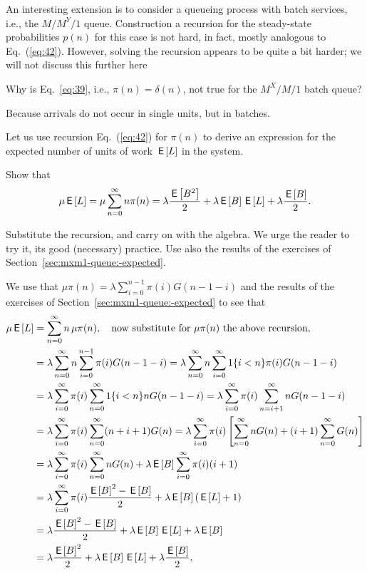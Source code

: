 An interesting extension is to consider a queueing process with batch
services, i.e., the $M/M^Y/1$ queue. Construction a recursion for the
steady-state probabilities $p(n)$ for this case is not hard, in fact,
mostly analogous to Eq.~(\ref{eq:42}).  However, solving the recursion
appears to be quite a bit harder; we will not discuss this further here

\begin{exercise}
  Why is Eq.~\eqref{eq:39}, i.e., $\pi(n)=\delta(n)$, not true for the
  $M^X/M/1$ batch queue?
\begin{solution}
 Because arrivals do not occur in single units, but in batches.
\end{solution}
\end{exercise}

Let us use  recursion Eq.~(\ref{eq:42}) for $\pi(n)$ to
 derive an expression for the expected number of units of work $\,\mathsf{E}\left[L\right]$
 in the system.
\begin{exercise}
 Show that
\begin{equation}\label{eq:67}
  \mu \,\mathsf{E}\left[L\right] =\mu \sum_{n=0}^\infty n \pi(n) = \lambda \frac{\,\mathsf{E}\left[B^2\right]}2  + \lambda \,\mathsf{E}\left[B\right] \,\mathsf{E}\left[L\right] +\lambda \frac{\,\mathsf{E}\left[B\right]}2.
\end{equation}
\begin{hint}
Substitute the
  recursion, and carry on with the algebra. We urge the reader to try
  it, its good (necessary) practice.  Use also the results of the
  exercises of Section~\ref{sec:mxm1-queue:-expected}.  
\end{hint}
\begin{solution}
  We use that $\mu \pi(n) =\lambda \sum_{i=0}^{n-1} \pi(i) G(n-1-i)$
  and the results of the exercises of
  Section~\ref{sec:mxm1-queue:-expected} to see that
\begin{align*}
  \mu \,\mathsf{E}\left[L\right]
  &=\sum_{n=0}^\infty n\, \mu \pi(n), \quad \text{now substitute for $\mu \pi(n)$ the above recursion}, \\
& =\lambda \sum_{n=0}^\infty n \sum_{i=0}^{n-1} \pi(i) G(n-1-i) 
  =\lambda \sum_{n=0}^\infty n \sum_{i=0}^\infty 1\{i<n\} \pi(i) G(n-1-i) \\
& =\lambda \sum_{i=0}^\infty \pi(i) \sum_{n=0}^\infty 1\{i<n\} n G(n-1-i) 
  =\lambda \sum_{i=0}^\infty \pi(i) \sum_{n=i+1}^\infty n G(n-1-i) \\
& =\lambda \sum_{i=0}^\infty \pi(i) \sum_{n=0}^\infty (n+i+1) G(n) 
  =\lambda \sum_{i=0}^\infty \pi(i) \left[\sum_{n=0}^\infty n G(n) +(i+1) \sum_{n=0}^\infty G(n)\right]  \\
  &=\lambda \sum_{i=0}^\infty \pi(i)\sum_{n=0}^\infty n G(n) +\lambda  \,\mathsf{E}\left[B\right] \sum_{i=0}^\infty \pi(i) (i+1)  \\ 
  &=\lambda \sum_{i=0}^\infty \pi(i) \frac{\,\mathsf{E}\left[B\right]^2 -\,\mathsf{E}\left[B\right]}2  + \lambda \,\mathsf{E}\left[B\right] (\,\mathsf{E}\left[L\right] +1)  \\ 
  &= \lambda \frac{\,\mathsf{E}\left[B\right]^2 -\,\mathsf{E}\left[B\right]}2  + \lambda \,\mathsf{E}\left[B\right] \,\mathsf{E}\left[L\right] +\lambda \,\mathsf{E}\left[B\right] \\
  &= \lambda \frac{\,\mathsf{E}\left[B\right]^2 }2  + \lambda \,\mathsf{E}\left[B\right] \,\mathsf{E}\left[L\right] +\lambda \frac{\,\mathsf{E}\left[B\right]}2,
\end{align*}
\end{solution}
\end{exercise}

